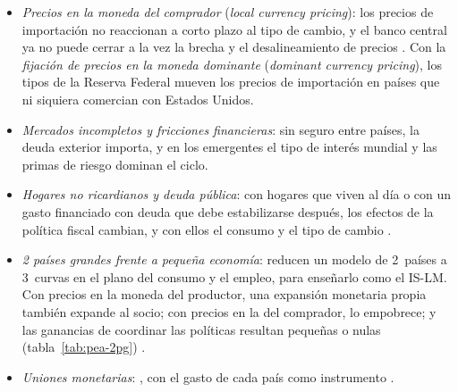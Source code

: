 \documentclass[11pt]{article}
\begin{document}
\begin{itemize}
\item \emph{Precios en la moneda del comprador} (\emph{local currency pricing}): los precios de importación no reaccionan a corto plazo al tipo de cambio, y el banco central ya no puede cerrar a la vez la brecha y el desalineamiento de precios\nocite{CorsettiPesenti2009} . Con la \emph{fijación de precios en la moneda dominante} (\emph{dominant currency pricing}), los tipos de la Reserva Federal mueven los precios de importación en países que ni siquiera comercian con Estados Unidos\nocite{Gopinath2020DCP}.
\item \emph{Mercados incompletos y fricciones financieras}: sin seguro entre países, la deuda exterior importa, y en los emergentes el tipo de interés mundial y las primas de riesgo dominan el ciclo\nocite{UribeSchmittGrohe2017Open}.
\item \emph{Hogares no ricardianos y deuda pública}: con hogares que viven al día o con un gasto financiado con deuda que debe estabilizarse después, los efectos de la política fiscal cambian, y con ellos el consumo y el tipo de cambio\nocite{GaliLopezSalidoValles2007,ZeynelogluKoenig2016} .
\item \emph{2 países grandes frente a pequeña economía}: \textcite{CorsettiPesenti2005} reducen un modelo de 2~países a 3~curvas en el plano del consumo y el empleo, para enseñarlo como el IS-LM. Con precios en la moneda del productor, una expansión monetaria propia también expande al socio; con precios en la del comprador, lo empobrece; y las ganancias de coordinar las políticas resultan pequeñas o nulas (tabla~\ref{tab:pea-2pg}) .
\item \emph{Uniones monetarias}: \textcite{GaliMonacelli2008Optimal}, con el gasto de cada país como instrumento .
\end{itemize}
\end{document}
